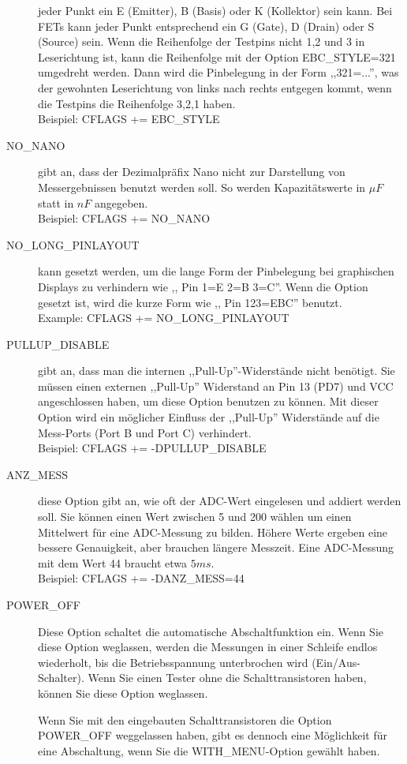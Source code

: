 \begin{description}
jeder Punkt ein E (Emitter), B (Basis) oder K (Kollektor) sein kann.
Bei FETs kann jeder Punkt entsprechend ein G (Gate), D (Drain) oder S (Source) sein.
Wenn die Reihenfolge der Testpins nicht 1,2 und 3 in Leserichtung ist, kann die Reihenfolge mit der Option EBC\_STYLE=321 
umgedreht werden. Dann wird die Pinbelegung in der Form ,,321=...'', was der gewohnten Leserichtung von links nach rechts
entgegen kommt, wenn die Testpins die Reihenfolge 3,2,1 haben.\\
Beispiel: CFLAGS += EBC\_STYLE
  \item[NO\_NANO] gibt an, dass der Dezimalpräfix Nano nicht zur Darstellung von Messergebnissen benutzt werden soll.
So werden Kapazitätswerte in \(\mu F\) statt in \(nF\) angegeben.\\
Beispiel: CFLAGS += NO\_NANO
  \item[NO\_LONG\_PINLAYOUT] kann gesetzt werden, um die lange Form der Pinbelegung bei graphischen Displays zu verhindern
 wie ,, Pin  1=E 2=B 3=C''.
Wenn die Option gesetzt ist, wird die kurze Form wie ,, Pin  123=EBC'' benutzt.\\
Example: CFLAGS += NO\_LONG\_PINLAYOUT
  \item[PULLUP\_DISABLE] gibt an, dass man die internen ,,Pull-Up''-Widerstände nicht benötigt.
 Sie müssen einen externen ,,Pull-Up'' Widerstand an Pin 13 (PD7) und VCC angeschlossen haben, um diese
Option benutzen zu können.
Mit dieser Option wird ein möglicher Einfluss der ,,Pull-Up'' Widerstände auf die Mess-Ports (Port B und Port C) verhindert.\\
Beispiel: CFLAGS += -DPULLUP\_DISABLE

  \item[ANZ\_MESS] diese Option gibt an, wie oft der ADC-Wert eingelesen und addiert werden soll.
Sie können einen Wert zwischen 5 und 200 wählen um einen Mittelwert für eine ADC-Messung zu bilden.
Höhere Werte ergeben eine bessere Genauigkeit, aber brauchen längere Messzeit.
Eine ADC-Messung mit dem Wert 44 braucht etwa \(5ms\).\\
Beispiel: CFLAGS += -DANZ\_MESS=44

  \item[POWER\_OFF] Diese Option schaltet die automatische Abschaltfunktion ein.
Wenn Sie diese Option weglassen, werden die Messungen in einer Schleife endlos wiederholt, bis die Betriebsspannung 
unterbrochen wird (Ein/Aus-Schalter).
Wenn Sie einen Tester ohne die Schalttransistoren haben, können Sie diese Option weglassen.

Wenn Sie mit den eingebauten Schalttransistoren die Option POWER\_OFF weggelassen haben,
gibt es dennoch eine Möglichkeit für eine Abschaltung, wenn Sie die WITH\_MENU-Option gewählt haben.


\end{description}
